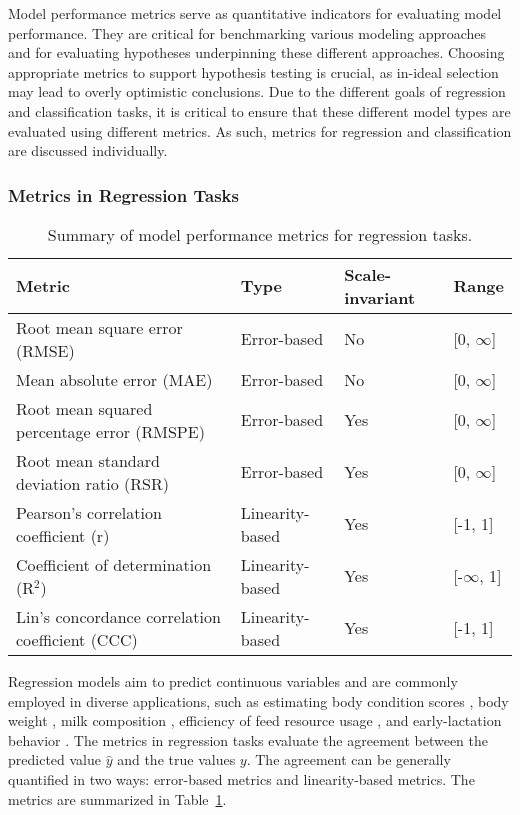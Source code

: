 Model performance metrics serve as quantitative indicators for evaluating model performance. They are critical for benchmarking various modeling approaches and for evaluating hypotheses underpinning these different approaches. Choosing appropriate metrics to support hypothesis testing is crucial, as in-ideal selection may lead to overly optimistic conclusions. Due to the different goals of regression and classification tasks, it is critical to ensure that these different model types are evaluated using different metrics. As such, metrics for regression and classification are discussed individually.

\subsubsection{Metrics in Regression Tasks}

\begin{table}[H]
    \caption{Summary of model performance metrics for regression tasks.}
    \centering
    \begin{tabular}{llll}
        \toprule
        Metric & Type & Scale-invariant & Range \\
        \midrule
        Root mean square error (RMSE) & Error-based & No & [0, $\infty$] \\
        Mean absolute error (MAE) & Error-based & No & [0, $\infty$] \\
        Root mean squared percentage error (RMSPE) & Error-based & Yes & [0, $\infty$] \\
        Root mean standard deviation ratio (RSR) & Error-based & Yes & [0, $\infty$] \\
        Pearson's correlation coefficient (r) & Linearity-based  & Yes & [-1, 1] \\
        Coefficient of determination (R$^2$) & Linearity-based & Yes & [-$\infty$, 1] \\
        Lin's concordance correlation coefficient (CCC) & Linearity-based & Yes & [-1, 1] \\
        \bottomrule
    \end{tabular}
    \label{tab:metrics-reg}
\end{table}

Regression models aim to predict continuous variables and are commonly employed in diverse applications, such as estimating body condition scores \citep{spoliansky_development_2016, yukun_automatic_2019}, body weight \citep{song_automated_2018,xavier_use_2022}, milk composition \citep{rovere_prediction_2021,mota_real-time_2022,mantysaari_body_2019,frizzarin_predicting_2021}, efficiency of feed resource usage \citep{grelet_potential_2020, appuhamy_prediction_2016,de_souza_predicting_2018}, and early-lactation behavior \citep{van_dixhoorn_indicators_2018}. The metrics in regression tasks evaluate the agreement between the predicted value $\hat{y}$ and the true values $y$. The agreement can be generally quantified in two ways: error-based metrics and linearity-based metrics. The metrics are summarized in Table~\ref{tab:metrics-reg}. 

